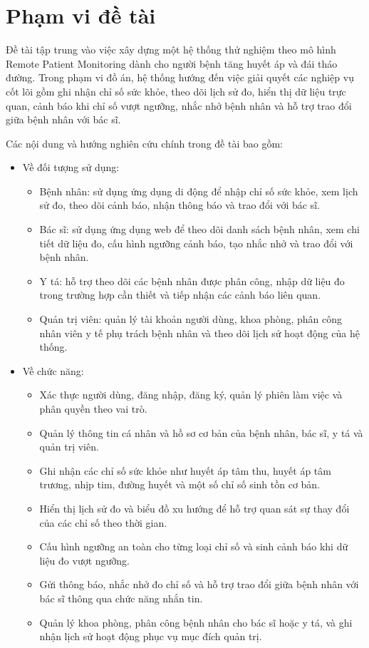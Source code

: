 \section{Phạm vi đề tài}
Đề tài tập trung vào việc xây dựng một hệ thống thử nghiệm theo mô hình Remote Patient Monitoring dành cho người bệnh tăng huyết áp và đái tháo đường. Trong phạm vi đồ án, hệ thống hướng đến việc giải quyết các nghiệp vụ cốt lõi gồm ghi nhận chỉ số sức khỏe, theo dõi lịch sử đo, hiển thị dữ liệu trực quan, cảnh báo khi chỉ số vượt ngưỡng, nhắc nhở bệnh nhân và hỗ trợ trao đổi giữa bệnh nhân với bác sĩ.

Các nội dung và hướng nghiên cứu chính trong đề tài bao gồm:
\begin{itemize}
    \item Về đối tượng sử dụng:
    \begin{itemize}
        \item Bệnh nhân: sử dụng ứng dụng di động để nhập chỉ số sức khỏe, xem lịch sử đo, theo dõi cảnh báo, nhận thông báo và trao đổi với bác sĩ.
        \item Bác sĩ: sử dụng ứng dụng web để theo dõi danh sách bệnh nhân, xem chi tiết dữ liệu đo, cấu hình ngưỡng cảnh báo, tạo nhắc nhở và trao đổi với bệnh nhân.
        \item Y tá: hỗ trợ theo dõi các bệnh nhân được phân công, nhập dữ liệu đo trong trường hợp cần thiết và tiếp nhận các cảnh báo liên quan.
        \item Quản trị viên: quản lý tài khoản người dùng, khoa phòng, phân công nhân viên y tế phụ trách bệnh nhân và theo dõi lịch sử hoạt động của hệ thống.
    \end{itemize}

    \item Về chức năng:
    \begin{itemize}
        \item Xác thực người dùng, đăng nhập, đăng ký, quản lý phiên làm việc và phân quyền theo vai trò.
        \item Quản lý thông tin cá nhân và hồ sơ cơ bản của bệnh nhân, bác sĩ, y tá và quản trị viên.
        \item Ghi nhận các chỉ số sức khỏe như huyết áp tâm thu, huyết áp tâm trương, nhịp tim, đường huyết và một số chỉ số sinh tồn cơ bản.
        \item Hiển thị lịch sử đo và biểu đồ xu hướng để hỗ trợ quan sát sự thay đổi của các chỉ số theo thời gian.
        \item Cấu hình ngưỡng an toàn cho từng loại chỉ số và sinh cảnh báo khi dữ liệu đo vượt ngưỡng.
        \item Gửi thông báo, nhắc nhở đo chỉ số và hỗ trợ trao đổi giữa bệnh nhân với bác sĩ thông qua chức năng nhắn tin.
        \item Quản lý khoa phòng, phân công bệnh nhân cho bác sĩ hoặc y tá, và ghi nhận lịch sử hoạt động phục vụ mục đích quản trị.
    \end{itemize}


\end{itemize}
